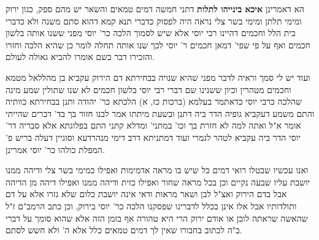 \documentclass[12pt, openany]{book}
\newcommand{\sethebfont}{
\fontsize{10.5pt}{21.0pt} \selectfont
}
\newcommand{\twocol}[1]{
	{\sethebfont \begin{multicols}{2}
			#1
	\end{multicols}}	
}
\begin{document}
\twocol{ הא דאמרינן \textbf{איכא בינייהו לתלות}  דתני חמשה דמים טמאים והשאר יש מהם ספק, כגון ירוק ומימי תלתן ומימי בשר צלי נראה היה לפסוק כדברי תנא קמא דהוא סתם משנה ולא כדברי בית הלל וחכמים דהיינו רבי יוסי אלא שיש לסמוך הלכה כר' יוסי מפני ששנו אותה בלשון חכמים ואף על פי שפי' דמאן חכמים ר' יוסי לכך שנו אותה תחלה לומר כן שהיא הלכה וחזרו והזכירו דבר בשם אומרו להביא גאולה לעולם.\par  ועוד יש לי סמך וראיה לדבר מפני שהיא שנויה בבחירתא דם הירוק עקביא בן מהללאל מטמא וחכמים מטהרין וכיון ששנינו שם דברי רבי יוסי בלשון חכמים לא שנו שתולין שמע מינה שהלכה כרבי יוסי כדאתמר בעלמא (ברכות כז, א) הלכתא כר' יהודה ותנן בבחירתא כוותיה והתם משמע דעקביא גופיה הדר ביה דתנן ובשעת מיתתו אמר לבנו חזור בך בד' דברים שהייתי אומר א"ל ואתה למה לא חזרת בך וכו' במתני' ומדלא קתני התם בפלוגתא אלא סבריה דר' יוסי הדר ביה עקביא לטהר לגמרי ועוד דמתניתא דרב דימי מנהרדעא וסוגיין דעלה בריש פ' המפלת כולהו כר' יוסי אמרינן.\par  ואנו עכשיו שבטלו רואי דמים כל שיש בו מראה אדמימות ואפילו כמימי בשר צלי ודיהה ממנו יושבת עליו שבעה נקיים וכן בכל מראה שחור ואפילו כזית ודיהה ממנו ואפילו דיהה מן הדיהה אבל בדם הירוק ואצ"ל לבן ושאר מראות ודאי אינה יושבת כלום שלא גזרו אלא על דם ותולדותיו אבל אלו אינן בכלל לדברינו שפסקנו הלכה כר' יוסי בירוק, וכן כתב הרמב"ם ז"ל שהאשה שראתה לובן או אודם ירוק הרי היא טהורה אף בזמן הזה אלא שהוא סומך על דברי ב"ה לכתוב בחבורו שאין לך דמים טמאים כלל אלא ה' ולא חשש לסתם. 
}
\end{document}
